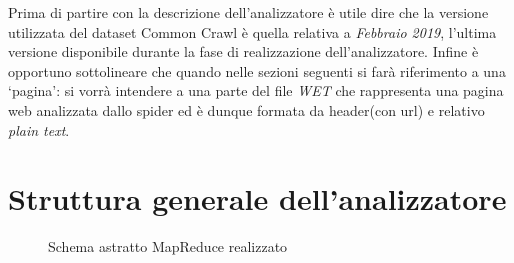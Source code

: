 \documentclass{article}
\newcommand{\MR}{MapReduce}
\newcommand{\WET}{\textit{WET}}
\newcommand{\CC}{Common Crawl}
\newcommand{\pt}{\textit{plain text}}
\begin{document}
Prima di partire con la descrizione dell'analizzatore è utile dire che la versione utilizzata del dataset \CC{} è quella relativa a \textit{Febbraio 2019}, l'ultima versione disponibile durante la fase di realizzazione dell'analizzatore. Infine è opportuno sottolineare che quando nelle sezioni seguenti si farà riferimento a una `pagina': si vorrà intendere  a una parte del file \WET{} che rappresenta una pagina web analizzata dallo spider ed è dunque formata da header(con url) e relativo \pt{}.

\newpage
\section{Struttura generale dell'analizzatore}

\begin{figure}[H]
  \centering
  
  \caption{Schema astratto \MR{} realizzato}
\end{figure}
\end{document}
